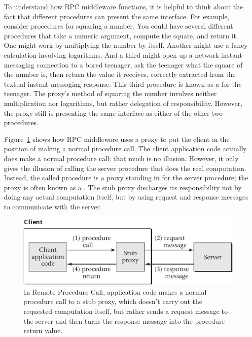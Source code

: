 To understand how RPC middleware functions, it is helpful to
think about the fact that different procedures can present the same
interface.  For example, consider procedures for squaring a number.
You could have several different procedures that take a numeric
argument, compute the square, and return it.  One might work by
multiplying the number by itself.  Another might use a fancy
calculation involving logarithms.  And a third might open up a network
instant-messaging connection to a bored teenager, ask the teenager
what the square of the number is, then return the value it receives,
correctly extracted from the textual instant-messaging response.  This
third procedure is known as a  for the teenager.  The
proxy's method of squaring the number involves neither multiplication
nor logarithms, but rather delegation of responsibility.  However, the
proxy still is presenting the same interface as either of the other
two procedures.

Figure~\ref{scan-10-3} shows how RPC middleware uses a proxy to
put the client in the position of making a normal procedure call.  The
client application code actually does make a normal procedure call;
that much is no illusion.  However, it only gives the illusion of
calling the server procedure that does the real computation.  Instead,
the called procedure is a proxy standing in for the server procedure;
the proxy is often known as a .  The stub proxy discharges
its responsibility not by doing any actual computation itself, but by
using request and response messages to communicate with the server.
\begin{figure}
\centerline{\includegraphics{hail_f1003}}
\caption{In Remote Procedure Call, application code makes a normal
  procedure call to a stub proxy, which doesn't carry out the
  requested computation itself, but rather sends a request message to
  the server and then turns the response message into the procedure
  return value.}
\label{scan-10-3}
\end{figure}

